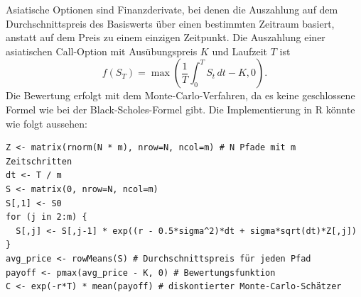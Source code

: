 \begin{bsp}
Asiatische Optionen sind Finanzderivate, bei denen die Auszahlung auf dem Durchschnittspreis
des Basiswerts über einen bestimmten Zeitraum basiert, anstatt auf dem Preis zu einem einzigen Zeitpunkt.
Die Auszahlung einer asiatischen Call-Option mit Ausübungspreis $K$ und Laufzeit $T$ ist
$$f(S_T) = \max\left(\frac{1}{T} \int_0^T S_t\,dt - K, 0\right).$$
Die Bewertung erfolgt mit dem Monte-Carlo-Verfahren, da es keine geschlossene Formel wie bei der Black-Scholes-Formel gibt.
Die Implementierung in R könnte wie folgt aussehen:

\begin{lstlisting}
Z <- matrix(rnorm(N * m), nrow=N, ncol=m) # N Pfade mit m Zeitschritten
dt <- T / m
S <- matrix(0, nrow=N, ncol=m)
S[,1] <- S0
for (j in 2:m) {
  S[,j] <- S[,j-1] * exp((r - 0.5*sigma^2)*dt + sigma*sqrt(dt)*Z[,j])
}
avg_price <- rowMeans(S) # Durchschnittspreis für jeden Pfad
payoff <- pmax(avg_price - K, 0) # Bewertungsfunktion
C <- exp(-r*T) * mean(payoff) # diskontierter Monte-Carlo-Schätzer
\end{lstlisting}

\end{bsp}